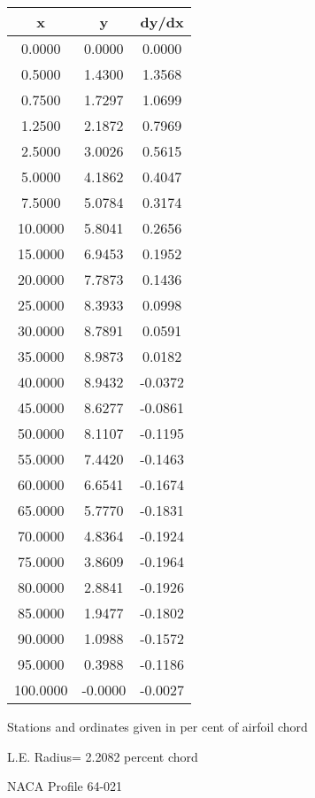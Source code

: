 \documentclass[11pt]{book}
\begin{document}
 \vspace{8mm}
 \begin{tabular}{|c|c|c|} \hline 
  x  &  y  &  dy/dx \\
 \hline
0.0000 & 0.0000 & 0.0000 \\
0.5000 & 1.4300 & 1.3568 \\
0.7500 & 1.7297 & 1.0699 \\
1.2500 & 2.1872 & 0.7969 \\
2.5000 & 3.0026 & 0.5615 \\
5.0000 & 4.1862 & 0.4047 \\
7.5000 & 5.0784 & 0.3174 \\
10.0000 & 5.8041 & 0.2656 \\
15.0000 & 6.9453 & 0.1952 \\
20.0000 & 7.7873 & 0.1436 \\
25.0000 & 8.3933 & 0.0998 \\
30.0000 & 8.7891 & 0.0591 \\
35.0000 & 8.9873 & 0.0182 \\
40.0000 & 8.9432 & -0.0372 \\
45.0000 & 8.6277 & -0.0861 \\
50.0000 & 8.1107 & -0.1195 \\
55.0000 & 7.4420 & -0.1463 \\
60.0000 & 6.6541 & -0.1674 \\
65.0000 & 5.7770 & -0.1831 \\
70.0000 & 4.8364 & -0.1924 \\
75.0000 & 3.8609 & -0.1964 \\
80.0000 & 2.8841 & -0.1926 \\
85.0000 & 1.9477 & -0.1802 \\
90.0000 & 1.0988 & -0.1572 \\
95.0000 & 0.3988 & -0.1186 \\
100.0000 & -0.0000 & -0.0027 \\
 \hline
 \end{tabular}
 \vspace{8mm}


Stations and ordinates given in per cent of airfoil chord 


L.E. Radius=  2.2082 percent chord
 \newpage
  \label{p64-021}
 \begin{Large}
 NACA Profile 64-021
 \end{Large}
  
\end{document}
